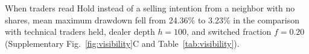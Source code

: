 When traders read Hold instead of a selling intention from a neighbor
with no shares, mean maximum drawdown fell from
24.36\% to 3.23\%
in the comparison with technical traders held, dealer depth $h=100$,
and switched fraction $f=0.20$ (Supplementary
Fig.~\ref{fig:visibility}C and Table~\ref{tab:visibility}).
